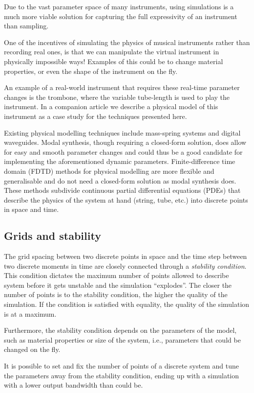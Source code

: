 \documentclass[reprint]{JASA}
\begin{document}
Due to the vast parameter space of many instruments, using simulations is a much more viable solution for capturing the full expressivity of an instrument than sampling.


One of the incentives of simulating the physics of musical instruments rather than recording real ones, is that we can manipulate the virtual instrument in physically impossible ways! Examples of this could be to change material properties, or even the shape of the instrument on the fly.

An example of a real-world instrument that requires these real-time parameter changes is the trombone, where the variable tube-length is used to play the instrument. In a companion article we describe a physical model of this instrument as a case study for the techniques presented here. 

Existing physical modelling techniques include mass-spring systems and digital waveguides. Modal synthesis, though requiring a closed-form solution, does allow for easy and smooth parameter changes and could thus be a good candidate for implementing the aforementioned dynamic parameters. Finite-difference time domain (FDTD) methods for physical modelling are more flexible and generalisable and do not need a closed-form solution as modal synthesis does. These methods subdivide continuous partial differential equations (PDEs) that describe the physics of the system at hand (string, tube, etc.) into discrete points in space and time. 

\subsection{Grids and stability}
The grid spacing between two discrete points in space and the time step between two discrete moments in time are closely connected through a \textit{stability condition}. This condition dictates the maximum number of points allowed to describe system before it gets unstable and the simulation ``explodes''. The closer the number of points is to the stability condition, the higher the quality of the simulation. If the condition is satisfied with equality, the quality of the simulation is at a maximum.

Furthermore, the stability condition depends on the parameters of the model, such as material properties or size of the system, i.e., parameters that could be changed on the fly.

It is possible to set and fix the number of points of a discrete system and tune the parameters away from the stability condition, ending up with a simulation with a lower output bandwidth than could be.
\end{document}
